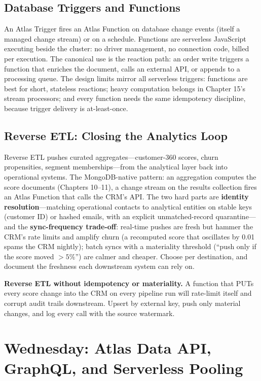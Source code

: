 \subsection{Database Triggers and Functions}
An Atlas Trigger fires an Atlas Function on database change events (itself a managed change stream) or on a schedule. Functions are serverless JavaScript executing beside the cluster: no driver management, no connection code, billed per execution. The canonical use is the reaction path: an order write triggers a function that enriches the document, calls an external API, or appends to a processing queue. The design limits mirror all serverless triggers: functions are best for short, stateless reactions; heavy computation belongs in Chapter 15's stream processors; and every function needs the same idempotency discipline, because trigger delivery is at-least-once.

\subsection{Reverse ETL: Closing the Analytics Loop}
Reverse ETL pushes curated aggregates---customer-360 scores, churn propensities, segment memberships---from the analytical layer back into operational systems. The MongoDB-native pattern: an aggregation computes the score documents (Chapters 10--11), a change stream on the results collection fires an Atlas Function that calls the CRM's API. The two hard parts are \textbf{identity resolution}---matching operational contacts to analytical entities on stable keys (customer ID) or hashed emails, with an explicit unmatched-record quarantine---and the \textbf{sync-frequency trade-off}: real-time pushes are fresh but hammer the CRM's rate limits and amplify churn (a recomputed score that oscillates by 0.01 spams the CRM nightly); batch syncs with a materiality threshold (``push only if the score moved $>5\%$'') are calmer and cheaper. Choose per destination, and document the freshness each downstream system can rely on.

\begin{pitfall}
\textbf{Reverse ETL without idempotency or materiality.} A function that PUTs every score change into the CRM on every pipeline run will rate-limit itself and corrupt audit trails downstream. Upsert by external key, push only material changes, and log every call with the source watermark.
\end{pitfall}

\section{Wednesday: Atlas Data API, GraphQL, and Serverless Pooling}
